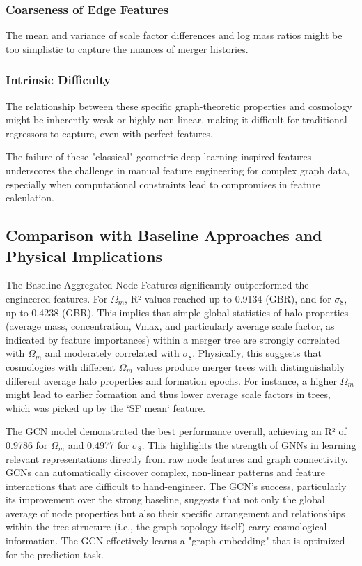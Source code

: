 \documentclass[twocolumn]{aastex631}
\begin{document}
\subsubsection{Coarseness of Edge Features}
The mean and variance of scale factor differences and log mass ratios might be too simplistic to capture the nuances of merger histories.

\subsubsection{Intrinsic Difficulty}
The relationship between these specific graph-theoretic properties and cosmology might be inherently weak or highly non-linear, making it difficult for traditional regressors to capture, even with perfect features.

The failure of these "classical" geometric deep learning inspired features underscores the challenge in manual feature engineering for complex graph data, especially when computational constraints lead to compromises in feature calculation.

\subsection{Comparison with Baseline Approaches and Physical Implications}

The Baseline Aggregated Node Features significantly outperformed the engineered features. For $\Omega_m$, R² values reached up to 0.9134 (GBR), and for $\sigma_8$, up to 0.4238 (GBR). This implies that simple global statistics of halo properties (average mass, concentration, Vmax, and particularly average scale factor, as indicated by feature importances) within a merger tree are strongly correlated with $\Omega_m$ and moderately correlated with $\sigma_8$. Physically, this suggests that cosmologies with different $\Omega_m$ values produce merger trees with distinguishably different average halo properties and formation epochs. For instance, a higher $\Omega_m$ might lead to earlier formation and thus lower average scale factors in trees, which was picked up by the `SF\ensuremath{\_}mean` feature.

The GCN model demonstrated the best performance overall, achieving an R² of 0.9786 for $\Omega_m$ and 0.4977 for $\sigma_8$. This highlights the strength of GNNs in learning relevant representations directly from raw node features and graph connectivity. GCNs can automatically discover complex, non-linear patterns and feature interactions that are difficult to hand-engineer. The GCN's success, particularly its improvement over the strong baseline, suggests that not only the global average of node properties but also their specific arrangement and relationships within the tree structure (i.e., the graph topology itself) carry cosmological information. The GCN effectively learns a "graph embedding" that is optimized for the prediction task.
\end{document}
